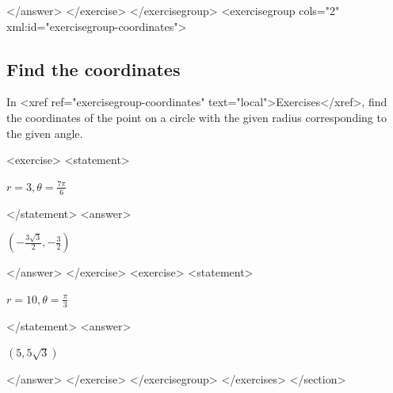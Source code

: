                   </answer>
              </exercise>
          </exercisegroup>
          <exercisegroup  cols="2"  xml:id="exercisegroup-coordinates">
            \subsection*{Find the coordinates}
              
                  In <xref ref="exercisegroup-coordinates" text="local">Exercises</xref>, find the coordinates of the point on a circle with the given radius corresponding to the given angle.
                  
              
              <exercise>
                  <statement>
                      
                        $r=3, \theta=\frac{7\pi}{6}$
                      
                  </statement>
                  <answer>
                    
                      $\left( -\frac{3\sqrt{3}}{2}, -\frac{3}{2} \right)$
                    
                  </answer>
              </exercise>
              <exercise>
                  <statement>
                      
                        $r=10, \theta=\frac{\pi}{3}$
                      
                  </statement>
                  <answer>
                    
                      $\left( 5, 5\sqrt{3} \right)$
                    
                  </answer>
              </exercise>
          </exercisegroup>
      </exercises>
</section>